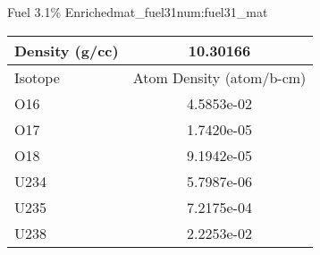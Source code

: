 \begin{matitem}{Fuel 3.1\% Enriched}{mat_fuel31}{num:fuel31_mat}
  \centering
  \begin{tabular}{l c}
    \toprule
    Density (g/cc) & 10.30166 \\
    \midrule
    Isotope & Atom Density (atom/b-cm) \\
    \midrule
    \midrule
O16 & 4.5853e-02 \\
O17 & 1.7420e-05 \\
O18 & 9.1942e-05 \\
U234 & 5.7987e-06 \\
U235 & 7.2175e-04 \\
U238 & 2.2253e-02 \\

    \bottomrule
  \end{tabular}
\end{matitem}
